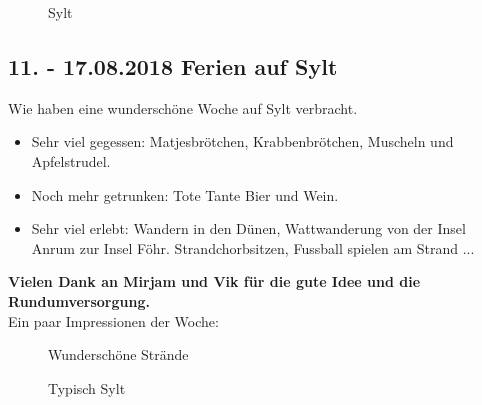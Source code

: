 \begin{figure}[b]
   \centering
   \quad
   \quad
   \quad
   \caption[Sylt]{Sylt}
\end{figure}

\subsection{11. - 17.08.2018 Ferien auf Sylt}
Wie haben eine wunderschöne Woche auf Sylt verbracht.

\begin{itemize}
\item Sehr viel gegessen: Matjesbrötchen, Krabbenbrötchen, Muscheln und Apfelstrudel.
\item Noch mehr getrunken: Tote Tante Bier und Wein.
\item Sehr viel erlebt: Wandern in den Dünen, Wattwanderung von der Insel Anrum zur Insel Föhr. Strandchorbsitzen, Fussball spielen am Strand ... 
\end{itemize} 
\textbf{Vielen Dank an Mirjam und Vik für die gute Idee und die Rundumversorgung.}\\
Ein paar Impressionen der Woche:

\begin{figure}[H]
   \centering
   \quad
   \quad
   \caption[Wunderschöne Strände]{Wunderschöne Strände}
\end{figure}

\begin{figure}[H]
   \centering
   \quad
   \quad
   \quad
   \caption[Typisch Sylt]{Typisch Sylt}
\end{figure}
\newpage

